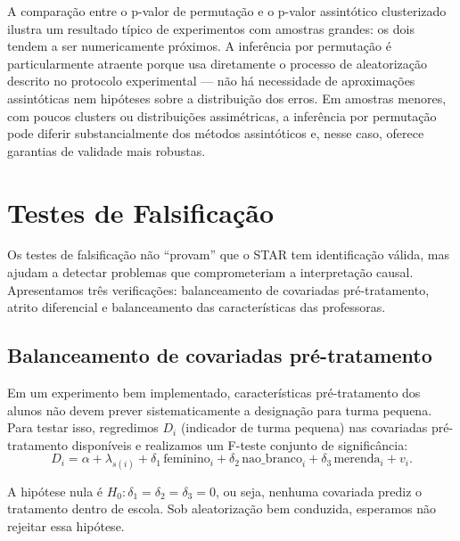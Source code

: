 A comparação entre o p-valor de permutação e o p-valor assintótico clusterizado ilustra um resultado típico de experimentos com amostras grandes: os dois tendem a ser numericamente próximos. A inferência por permutação é particularmente atraente porque usa diretamente o processo de aleatorização descrito no protocolo experimental --- não há necessidade de aproximações assintóticas nem hipóteses sobre a distribuição dos erros. Em amostras menores, com poucos clusters ou distribuições assimétricas, a inferência por permutação pode diferir substancialmente dos métodos assintóticos e, nesse caso, oferece garantias de validade mais robustas.


\section{Testes de Falsificação}
\label{sec:star_falsificacao}

Os testes de falsificação não ``provam'' que o STAR tem identificação válida, mas ajudam a detectar problemas que comprometeriam a interpretação causal. Apresentamos três verificações: balanceamento de covariadas pré-tratamento, atrito diferencial e balanceamento das características das professoras.

\subsection*{Balanceamento de covariadas pré-tratamento}

Em um experimento bem implementado, características pré-tratamento dos alunos não devem prever sistematicamente a designação para turma pequena. Para testar isso, regredimos $D_i$ (indicador de turma pequena) nas covariadas pré-tratamento disponíveis e realizamos um F-teste conjunto de significância:
\begin{equation}
  D_i = \alpha + \lambda_{s(i)} + \delta_1\,\text{feminino}_i + \delta_2\,\text{nao\_branco}_i + \delta_3\,\text{merenda}_i + v_i.
  \label{eq:teste_balanceamento}
\end{equation}

A hipótese nula é $H_0: \delta_1 = \delta_2 = \delta_3 = 0$, ou seja, nenhuma covariada prediz o tratamento dentro de escola. Sob aleatorização bem conduzida, esperamos não rejeitar essa hipótese.

